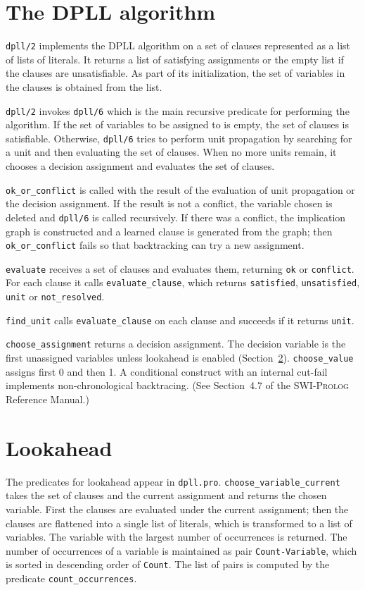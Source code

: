 \documentclass[11pt]{article}
\newcommand*{\p}[1]{\textup{\texttt{#1}}}
\newcommand*{\sw}{\textsc{SWI-Prolog}}
\begin{document}
\section{The DPLL algorithm}

\p{dpll/2} implements the DPLL algorithm on a set of
clauses represented as a list of lists of literals. It returns a list of
satisfying assignments or the empty list if the clauses are
unsatisfiable. As part of its initialization, the set of variables in
the clauses is obtained from the list.

\p{dpll/2} invokes \p{dpll/6} which is the main recursive
predicate for performing the algorithm. If the set of variables to be
assigned to is empty, the set of clauses is satisfiable. Otherwise,
\p{dpll/6} tries to perform unit propagation by searching for a unit and
then evaluating the set of clauses. When no more units remain, it
chooses a decision assignment and evaluates the set of clauses.

\p{ok\_or\_conflict} is called with the result of the
evaluation of unit propagation or the decision assignment. If the
result is not a conflict, the variable chosen is deleted and \p{dpll/6}
is called recursively. If there was a conflict, the implication graph is
constructed and a learned clause is generated from the graph; then
\p{ok\_or\_conflict} fails so that backtracking can try a new
assignment.

\p{evaluate} receives a set of clauses and evaluates them,
returning \p{ok} or \p{conflict}. For each clause it calls
\p{evaluate\_clause}, which returns \p{satisfied}, \p{unsatisfied},
\p{unit} or \p{not\_resolved}.

\p{find\_unit} calls \p{evaluate\_clause} on each clause and succeeds if it returns \p{unit}.

\p{choose\_assignment} returns a decision assignment. The decision variable is the first unassigned variables unless lookahead is enabled (Section~\ref{s.look}). \p{choose\_value} assigns first 0 and then 1. A conditional construct with an internal cut-fail implements non-chronological backtracing. (See Section~4.7 of the \sw{} Reference Manual.)

\section{Lookahead}\label{s.look}

The predicates for lookahead appear in \p{dpll.pro}. \p{choose\_variable\_current} takes the set of clauses and the current assignment and returns the chosen variable. First the clauses are evaluated under the current assignment; then the clauses are flattened into a single list of literals, which is transformed to a list of variables. The variable with the largest number of occurrences is returned. The number of occurrences of a variable is maintained as pair \p{Count-Variable}, which is sorted in descending order of \p{Count}. The list of pairs is computed by the predicate \p{count\_occurrences}.
\end{document}
